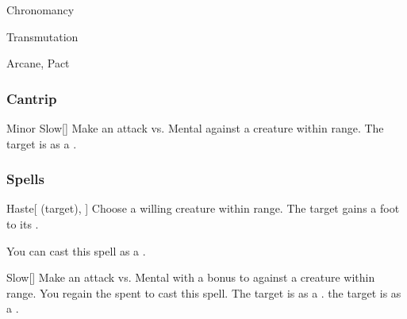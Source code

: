 \newpage
\begin{spellsection}{Chronomancy}

\begin{spellheader}
\end{spellheader}


 Transmutation

 Arcane, Pact

\subsubsection{Cantrip}


\begin{freeability}{Minor Slow}[]
Make an attack vs. Mental against a creature within \rngmed range.
\hit The target is  as a .
\end{freeability}

\end{spellsection}


\subsubsection{Spells}


\lowercase{\hypertarget{spell:Haste}{}}\label{spell:Haste}
\begin{attuneability}[\nth{1}]{\hypertarget{spell:Haste}{Haste}}[ (target), ]
Choose a willing creature within \rngmed range.
The target gains a  foot  to its .

You can cast this spell as a .
\end{attuneability}
\vspace{0.25em}



\lowercase{\hypertarget{spell:Slow}{}}\label{spell:Slow}
\begin{apability}[\nth{1}]{\hypertarget{spell:Slow}{Slow}}[]
Make an attack vs. Mental with a  bonus to  against a creature within \rngmed range.
\miss You regain the  spent to cast this spell.
\hit The target is  as a .
\crit the target is  as a .
\end{apability}
\vspace{0.25em}



